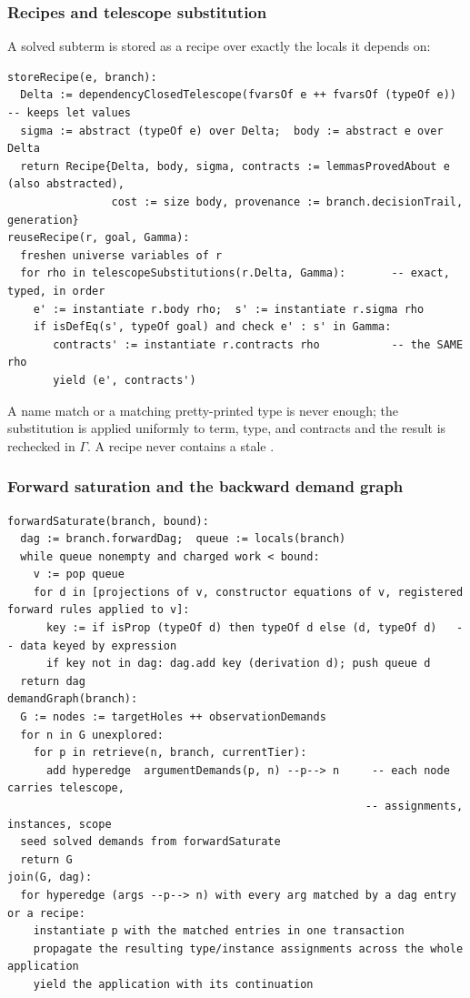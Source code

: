 \subsubsection{Recipes and telescope substitution}

A solved subterm is stored as a recipe over exactly the locals it depends on:

\begin{lstlisting}
storeRecipe(e, branch):
  Delta := dependencyClosedTelescope(fvarsOf e ++ fvarsOf (typeOf e))   -- keeps let values
  sigma := abstract (typeOf e) over Delta;  body := abstract e over Delta
  return Recipe{Delta, body, sigma, contracts := lemmasProvedAbout e (also abstracted),
                cost := size body, provenance := branch.decisionTrail, generation}
reuseRecipe(r, goal, Gamma):
  freshen universe variables of r
  for rho in telescopeSubstitutions(r.Delta, Gamma):       -- exact, typed, in order
    e' := instantiate r.body rho;  s' := instantiate r.sigma rho
    if isDefEq(s', typeOf goal) and check e' : s' in Gamma:
       contracts' := instantiate r.contracts rho           -- the SAME rho
       yield (e', contracts')
\end{lstlisting}

A name match or a matching pretty-printed type is never enough; the substitution is applied uniformly to term, type, and contracts and the result is rechecked in $\Gamma$. A recipe never contains a stale .

\subsubsection{Forward saturation and the backward demand graph}

\begin{lstlisting}
forwardSaturate(branch, bound):
  dag := branch.forwardDag;  queue := locals(branch)
  while queue nonempty and charged work < bound:
    v := pop queue
    for d in [projections of v, constructor equations of v, registered forward rules applied to v]:
      key := if isProp (typeOf d) then typeOf d else (d, typeOf d)   -- data keyed by expression
      if key not in dag: dag.add key (derivation d); push queue d
  return dag
demandGraph(branch):
  G := nodes := targetHoles ++ observationDemands
  for n in G unexplored:
    for p in retrieve(n, branch, currentTier):
      add hyperedge  argumentDemands(p, n) --p--> n     -- each node carries telescope,
                                                       -- assignments, instances, scope
  seed solved demands from forwardSaturate
  return G
join(G, dag):
  for hyperedge (args --p--> n) with every arg matched by a dag entry or a recipe:
    instantiate p with the matched entries in one transaction
    propagate the resulting type/instance assignments across the whole application
    yield the application with its continuation
\end{lstlisting}

